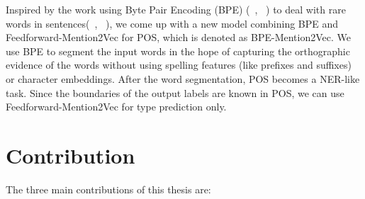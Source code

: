 \documentclass{sfuthesis}
\begin{document}
Inspired by the work using Byte Pair Encoding (BPE) (~\citeauthor{gage1994new}, ~\citeyear{gage1994new}) to deal with rare words in sentences(~\citeauthor{sennrich2015neural}, ~\citeyear{sennrich2015neural}), we come up with a new model combining BPE and Feedforward-Mention2Vec for POS, which is denoted as BPE-Mention2Vec. We use BPE to segment the input words in the hope of capturing the orthographic evidence of the words without using spelling features (like prefixes and suffixes) or character embeddings. After the word segmentation, POS becomes a NER-like task. Since the boundaries of the output labels are known in POS, we can use Feedforward-Mention2Vec for type prediction only.

\section{Contribution}
The three main contributions of this thesis are:
\end{document}
